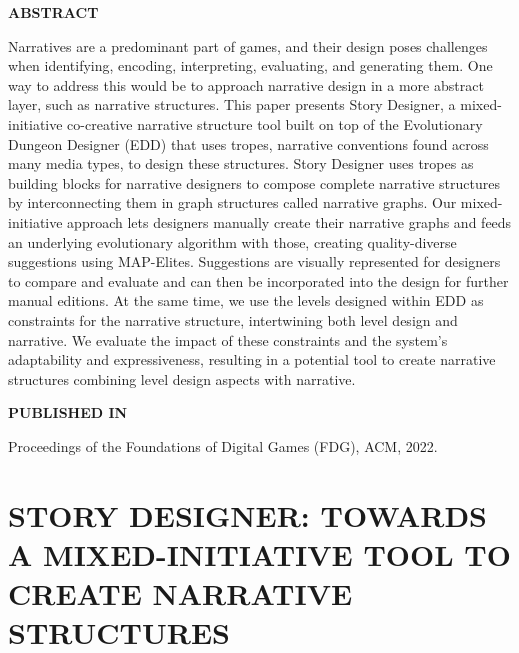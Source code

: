\graphicspath{{included-papers-tex/paper-11/}}



\normalfont
\textbf{\textsc{ABSTRACT}}

Narratives are a predominant part of games, and their design poses challenges when identifying, encoding, interpreting, evaluating, and generating them. One way to address this would be to approach narrative design in a more abstract layer, such as narrative structures. This paper presents Story Designer, a mixed-initiative co-creative narrative structure tool built on top of the Evolutionary Dungeon Designer (EDD) that uses tropes, narrative conventions found across many media types, to design these structures. Story Designer uses tropes as building blocks for narrative designers to compose complete narrative structures by interconnecting them in graph structures called narrative graphs. Our mixed-initiative approach lets designers manually create their narrative graphs and feeds an underlying evolutionary algorithm with those, creating quality-diverse suggestions using MAP-Elites. Suggestions are visually represented for designers to compare and evaluate and can then be incorporated into the design for further manual editions. At the same time, we use the levels designed within EDD as constraints for the narrative structure, intertwining both level design and narrative. We evaluate the impact of these constraints and the system's adaptability and expressiveness, resulting in a potential tool to create narrative structures combining level design aspects with narrative.

\textbf{\textsc{PUBLISHED IN}}

Proceedings of the Foundations of Digital Games (FDG), ACM, 2022.

\section*{STORY DESIGNER: TOWARDS A MIXED-INITIATIVE TOOL TO CREATE NARRATIVE STRUCTURES}




% 

% 



